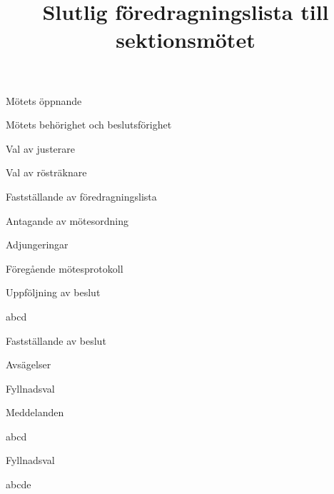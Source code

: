 \documentclass{sektionsmote}
\title{Slutlig föredragningslista till sektionsmötet}
\begin{document}
\maketitle

\begin{ootd}

\item{Mötets öppnande}

\item{Mötets behörighet och beslutsförighet}

\item{Val av justerare}

\item{Val av rösträknare}

\item{Fastställande av föredragningslista}

\item{Antagande av mötesordning}

\item{Adjungeringar}

\item{Föregående mötesprotokoll}

\item{Uppföljning av beslut}
\begin{ootd}
    \item abcd
\end{ootd}

\item{Fastställande av beslut}
\begin{ootd}
    \item Avsägelser
    \item Fyllnadsval
\end{ootd}

\item{Meddelanden}
\begin{ootd}
    \item abcd
\end{ootd}

\item{Fyllnadsval}
\begin{ootd}
    \item abcde
\end{ootd}


\end{ootd}
\end{document}
